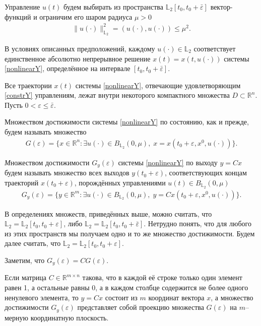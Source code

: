 \documentclass[../main.tex]{subfiles}
\begin{document}
 Управление $u(t)$ будем выбирать из
пространства $\mathbb{L}_2[t_0,t_0+\bar{\varepsilon}]$ вектор-функций и ограничим его шаром радиуса $ \mu > 0 $
\begin{gather}\label{constrY}
	\lVert u(\cdot)\rVert^2_{\mathbb{L}_2} = \left(u(\cdot),u(\cdot) \right) \leqslant \mu^2.
\end{gather}

В условиях описанных предположений, каждому $ u(\cdot) \in \mathbb{L}_2 $ соответствует единственное абсолютно непрерывное решение $ x(t)=x(t,u(\cdot)) $ системы \eqref{nonlinearY}, определённое на интервале $ [t_0,t_0+\bar{\varepsilon}] $.

Все траектории $ x(t) $ системы \eqref{nonlinearY}, отвечающие удовлетворяющим \eqref{constrY} управлениям,  лежат внутри некоторого компактного множества $ D \subset \mathbb{R}^n $. Пусть $ 0 <  \varepsilon \leqslant \bar{\varepsilon} $. 

Множеством достижимости системы \eqref{nonlinearY} по состоянию, как и прежде, будем называть множество \begin{gather*}
	G(\varepsilon)=\{x\in \mathbb{R}^n:\exists u(\cdot)\in B_{\mathbb{L}_2}(0,\mu),\; x=x(t_0+\varepsilon,x^0,u(\cdot))\}.
\end{gather*}


\begin{definition}
	{\textit Множеством достижимости $G_y(\varepsilon)$ системы \eqref{nonlinearY} по выходу} $ y = C x $ будем называть множество всех выходов $ y(t_0+\varepsilon) $,
	соответствующих концам траекторий $ x(t_0+\varepsilon) $, порождённых управлениями $ u(t) \in B_{\mathbb{L}_2}(0,\mu)$
	\begin{gather*}
		G_y(\varepsilon)=\{y\in \mathbb{R}^m:\exists u(\cdot)\in B_{\mathbb{L}_2}(0,\mu),\; y=Cx(t_0+\varepsilon,x^0,u(\cdot))\}.
	\end{gather*}
\end{definition}

В определениях множеств, приведённых выше, можно считать, что $ \mathbb{L}_2 =\mathbb{L}_2[t_0,t_0+\varepsilon] $, либо  $ \mathbb{L}_2=\mathbb{L}_2[t_0,t_0+\bar{\varepsilon}] $. Нетрудно понять, что для любого из этих пространств мы получаем одно и то же множество достижимости. Будем далее считать, что $ \mathbb{L}_2 =\mathbb{L}_2[t_0,t_0+\varepsilon] $.
	
Заметим, что  $ G_y(\varepsilon) = C G(\varepsilon) $.	
	
Если матрица $ C \in \mathbb{R}^{m \times n} $ такова, что в каждой её строке только один элемент равен 1, а остальные равны 0, а в каждом столбце содержится не более одного ненулевого элемента, то $ y=Cx $ состоит из $ m$ координат вектора $ x $, а  множество достижимости $G_y(\varepsilon)$ представляет собой проекцию множества $ G(\varepsilon) $ на $m$--мерную координатную плоскость.
\end{document}
